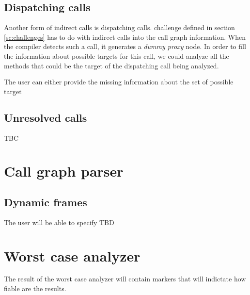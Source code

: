 \subsection{Dispatching calls}

Another form of indirect calls is dispatching calls. challenge defined
in section \ref{sc:challenges} has to do with indirect calls into the
call graph information. When the compiler detects such a call, it
generates a \emph{dummy proxy} node. In order to fill the information
about possible targets for this call, we could analyze all the methods
that could be the target of the dispatching call being analyzed.

The user can either provide the missing information about the set of
possible target

\subsection{Unresolved calls}

TBC

\section{Call graph parser}

\subsection{Dynamic frames}

The user will be able to specify
TBD

\section{Worst case analyzer}

The result of the worst case analyzer will contain markers that will
indictate how fiable are the results.


